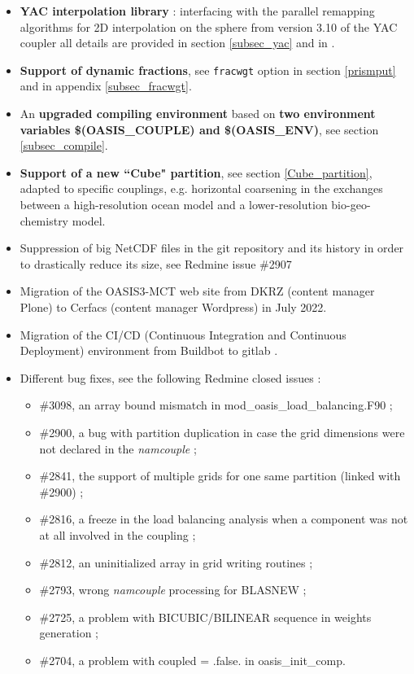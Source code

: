 \begin{itemize}

\item {\bf YAC interpolation library} :  interfacing with the parallel remapping algorithms for 2D interpolation on the sphere from version 3.10 of the YAC coupler  \citep{hanke2016} \citep{hanke2019}  all details are provided in section \ref{subsec_yac} and in \cite{jonville2024}.

\item {\bf Support of dynamic fractions}, see {\tt fracwgt} option in section \ref{prismput} and in appendix \ref{subsec_fracwgt}.

\item An {\bf upgraded compiling environment} based on {\bf two environment variables \$(OASIS\_COUPLE) and \$(OASIS\_ENV)}, see section \ref{subsec_compile}.

\item {\bf Support of a new ``Cube" partition}, see section \ref{Cube_partition}, adapted to specific
couplings, e.g. horizontal coarsening in the exchanges between a high-resolution
ocean model and a lower-resolution bio-geo-chemistry model.

\item Suppression of big NetCDF files in the git repository and its history in order to drastically reduce its size, see Redmine issue \#2907

\item Migration of the OASIS3-MCT web site from DKRZ (content manager Plone) to Cerfacs (content manager Wordpress) in July 2022.

\item Migration of the CI/CD (Continuous Integration and Continuous Deployment) environment from Buildbot to gitlab .

\item Different bug fixes, see the following Redmine closed issues :
\begin{itemize}
\item  \#3098, an array bound mismatch in mod\_oasis\_load\_balancing.F90 ;
\item   \#2900, a bug with partition duplication in case the grid dimensions were not declared in the {\it namcouple} ;
\item   \#2841, the support of multiple grids for one same partition (linked with \#2900) ;
\item   \#2816, a freeze in the load balancing analysis when a component was not at all involved in the coupling ;
\item   \#2812, an uninitialized array in grid writing routines ;
\item   \#2793, wrong {\it namcouple} processing for BLASNEW ;
\item   \#2725, a problem with BICUBIC/BILINEAR sequence in weights generation ;
\item   \#2704, a problem with coupled = .false. in oasis\_init\_comp.
\end{itemize}
\end{itemize}

